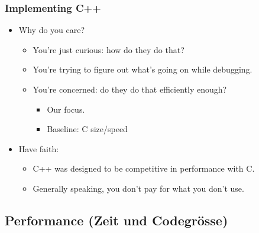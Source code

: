 \subsubsection{Implementing C++}
\begin{itemize}
	\item Why do you care?
	\begin{itemize}
		\item You're just curious: how do they do that?
		\item You're trying to figure out what's going on while debugging.
		\item You're concerned: do they do that efficiently enough?
		\begin{itemize}
			\item Our focus.
			\item Baseline: C size/speed
		\end{itemize}
	\end{itemize}
	\item Have faith:
	\begin{itemize}
		\item C++ was designed to be competitive in performance with C.
		\item Generally speaking, you don't pay for what you don't use.
	\end{itemize}
\end{itemize}

\subsection{Performance (Zeit und Codegrösse)}
